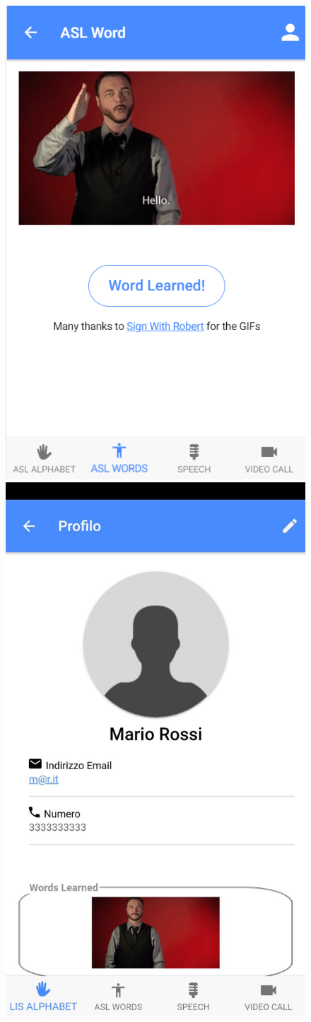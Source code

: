 \begin{figure}[h]
	\includegraphics[width=0.25\linewidth]{Figure/ASLWORDPAGE}
	\includegraphics[width=0.25\linewidth]{Figure/screenshot004}
	\label{fig:screenshot004}
\end{figure}
\clearpage
